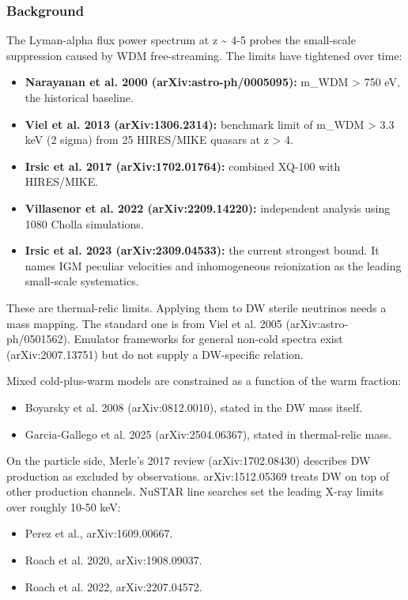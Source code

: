 \documentclass[11pt,a4paper]{article}
\begin{document}
\subsubsection*{Background}
The Lyman-alpha flux power spectrum at z \textasciitilde{} 4-5 probes the small-scale suppression caused by WDM free-streaming. The limits have tightened over time:

\begin{itemize}
  \item \textbf{Narayanan et al. 2000 (arXiv:astro-ph/0005095):} m\_WDM \textgreater{} 750 eV, the historical baseline.
  \item \textbf{Viel et al. 2013 (arXiv:1306.2314):} benchmark limit of m\_WDM \textgreater{} 3.3 keV (2 sigma) from 25 HIRES/MIKE quasars at z \textgreater{} 4.
  \item \textbf{Irsic et al. 2017 (arXiv:1702.01764):} combined XQ-100 with HIRES/MIKE.
  \item \textbf{Villasenor et al. 2022 (arXiv:2209.14220):} independent analysis using 1080 Cholla simulations.
  \item \textbf{Irsic et al. 2023 (arXiv:2309.04533):} the current strongest bound. It names IGM peculiar velocities and inhomogeneous reionization as the leading small-scale systematics.
\end{itemize}
These are thermal-relic limits. Applying them to DW sterile neutrinos needs a mass mapping. The standard one is from Viel et al. 2005 (arXiv:astro-ph/0501562). Emulator frameworks for general non-cold spectra exist (arXiv:2007.13751) but do not supply a DW-specific relation.

Mixed cold-plus-warm models are constrained as a function of the warm fraction:

\begin{itemize}
  \item Boyarsky et al. 2008 (arXiv:0812.0010), stated in the DW mass itself.
  \item Garcia-Gallego et al. 2025 (arXiv:2504.06367), stated in thermal-relic mass.
\end{itemize}
On the particle side, Merle's 2017 review (arXiv:1702.08430) describes DW production as excluded by observations. arXiv:1512.05369 treats DW on top of other production channels. NuSTAR line searches set the leading X-ray limits over roughly 10-50 keV:

\begin{itemize}
  \item Perez et al., arXiv:1609.00667.
  \item Roach et al. 2020, arXiv:1908.09037.
  \item Roach et al. 2022, arXiv:2207.04572.
\end{itemize}
\end{document}
